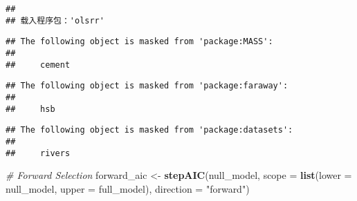 \documentclass[
]{article}
\newenvironment{Shaded}{\begin{snugshade}}{\end{snugshade}}
\newcommand{\AttributeTok}[1]{\textcolor[rgb]{0.13,0.29,0.53}{#1}}
\newcommand{\CommentTok}[1]{\textcolor[rgb]{0.56,0.35,0.01}{\textit{#1}}}
\newcommand{\FunctionTok}[1]{\textcolor[rgb]{0.13,0.29,0.53}{\textbf{#1}}}
\newcommand{\NormalTok}[1]{#1}
\newcommand{\OtherTok}[1]{\textcolor[rgb]{0.56,0.35,0.01}{#1}}
\newcommand{\StringTok}[1]{\textcolor[rgb]{0.31,0.60,0.02}{#1}}
\begin{document}
\begin{verbatim}
## 
## 载入程序包：'olsrr'
\end{verbatim}

\begin{verbatim}
## The following object is masked from 'package:MASS':
## 
##     cement
\end{verbatim}

\begin{verbatim}
## The following object is masked from 'package:faraway':
## 
##     hsb
\end{verbatim}

\begin{verbatim}
## The following object is masked from 'package:datasets':
## 
##     rivers
\end{verbatim}

\begin{Shaded}
\begin{Highlighting}[]
\CommentTok{\# Forward Selection}
\NormalTok{forward\_aic }\OtherTok{\textless{}{-}} \FunctionTok{stepAIC}\NormalTok{(null\_model, }
                         \AttributeTok{scope =} \FunctionTok{list}\NormalTok{(}\AttributeTok{lower =}\NormalTok{ null\_model, }\AttributeTok{upper =}\NormalTok{ full\_model), }\AttributeTok{direction =} \StringTok{"forward"}\NormalTok{)}
\end{Highlighting}
\end{Shaded}
\end{document}
